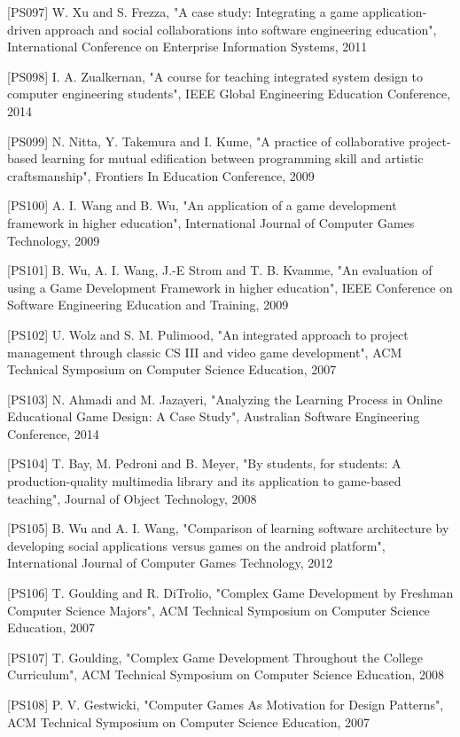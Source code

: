 [PS097]	W. Xu and S. Frezza, "A case study: Integrating a game application-driven approach and social collaborations into software engineering education", International Conference on Enterprise Information Systems, 2011

[PS098]	I. A. Zualkernan, "A course for teaching integrated system design to computer engineering students", IEEE Global Engineering Education Conference, 2014

[PS099]	N. Nitta, Y. Takemura and I. Kume, "A practice of collaborative project-based learning for mutual edification between programming skill and artistic craftsmanship", Frontiers In Education Conference, 2009

[PS100]	A. I. Wang and B. Wu, "An application of a game development framework in higher education", International Journal of Computer Games Technology, 2009

[PS101]	B. Wu, A. I. Wang, J.-E Strom and T. B. Kvamme, "An evaluation of using a Game Development Framework in higher education", IEEE Conference on Software Engineering Education and Training, 2009

[PS102]	U. Wolz and S. M. Pulimood, "An integrated approach to project management through classic CS III and video game development", ACM Technical Symposium on Computer Science Education, 2007

[PS103]	N. Ahmadi and M. Jazayeri, "Analyzing the Learning Process in Online Educational Game Design: A Case Study", Australian Software Engineering Conference, 2014

[PS104]	T. Bay, M. Pedroni and B. Meyer, "By students, for students: A production-quality multimedia library and its application to game-based teaching", Journal of Object Technology, 2008

[PS105]	B. Wu and A. I. Wang, "Comparison of learning software architecture by developing social applications versus games on the android platform", International Journal of Computer Games Technology, 2012

[PS106]	T. Goulding and R. DiTrolio, "Complex Game Development by Freshman Computer Science Majors", ACM Technical Symposium on Computer Science Education, 2007

[PS107]	T. Goulding, "Complex Game Development Throughout the College Curriculum", ACM Technical Symposium on Computer Science Education, 2008

[PS108]	P. V. Gestwicki, "Computer Games As Motivation for Design Patterns", ACM Technical Symposium on Computer Science Education, 2007

